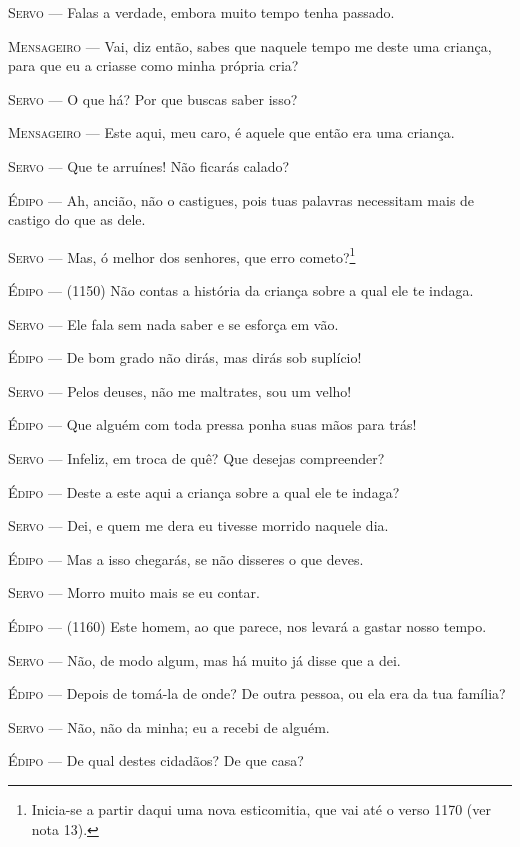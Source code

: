 \textsc{Servo} --- Falas a verdade, embora muito tempo tenha passado.

\textsc{Mensageiro} --- Vai, diz então, sabes que naquele tempo me deste uma criança, para que
eu a criasse como minha própria cria?

\textsc{Servo} --- O que há? Por que buscas saber isso?

\textsc{Mensageiro} --- Este aqui, meu caro, é aquele que então era uma criança.

\textsc{Servo} --- Que te arruínes! Não ficarás calado?

\textsc{Édipo} --- Ah, ancião, não o castigues, pois tuas palavras necessitam mais de
castigo do que as dele.

\textsc{Servo} --- Mas, ó melhor dos senhores, que erro cometo?\footnote{Inicia-se a partir daqui uma nova esticomitia,
  que vai até o verso 1170 (ver nota 13).}

\textsc{Édipo} --- (1150) Não contas a história da criança sobre a qual ele te indaga.

\textsc{Servo} --- Ele fala sem nada saber e se esforça em vão.

\textsc{Édipo} --- De bom grado não dirás, mas dirás sob suplício!

\textsc{Servo} --- Pelos deuses, não me maltrates, sou um velho!

\textsc{Édipo} --- Que alguém com toda pressa ponha suas mãos para trás!

\textsc{Servo} --- Infeliz, em troca de quê? Que desejas compreender?

\textsc{Édipo} --- Deste a este aqui a criança sobre a qual ele te indaga?

\textsc{Servo} --- Dei, e quem me dera eu tivesse morrido naquele dia.

\textsc{Édipo} --- Mas a isso chegarás, se não disseres o que deves.

\textsc{Servo} --- Morro muito mais se eu contar.

\textsc{Édipo} --- (1160) Este homem, ao que parece, nos levará a gastar nosso tempo.

\textsc{Servo} --- Não, de modo algum, mas há muito já disse que a dei.

\textsc{Édipo} --- Depois de tomá-la de onde? De outra pessoa, ou ela era da tua família?

\textsc{Servo} --- Não, não da minha; eu a recebi de alguém.

\textsc{Édipo} --- De qual destes cidadãos? De que casa?


